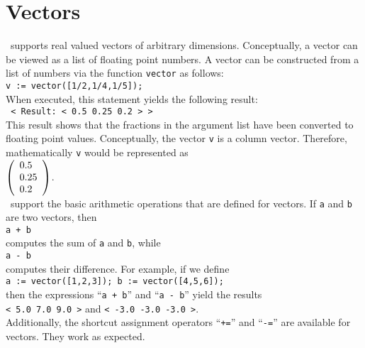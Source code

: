 \section{Vectors}
\setlx\ supports real valued vectors of arbitrary dimensions.  Conceptually, a vector can be viewed as
a list of floating point numbers.  A vector can be constructed from a list of numbers via the
function \texttt{vector} as follows:
\\[0.2cm]
\hspace*{1.3cm}
\texttt{v := vector([1/2,1/4,1/5]);}
\\[0.2cm]
When executed, this statement yields the following result:
\\[0.2cm]
\hspace*{1.3cm}
\texttt{~< Result: < 0.5  0.25  0.2 > >~}
\\[0.2cm]
This result shows that the fractions in the argument list have been converted to floating point
values.  Conceptually, the vector \texttt{v} is a column vector.  Therefore, mathematically
\texttt{v} would be represented as
\\[0.2cm]
\hspace*{1.3cm}
$
\left(\begin{array}[c]{l}
  0.5  \\
  0.25 \\
  0.2
\end{array}\right)
$.
\\[0.2cm]
\setlx\ support the basic arithmetic operations that are defined for vectors.  If \texttt{a} and
\texttt{b} are two vectors, then 
\\[0.2cm]
\hspace*{1.3cm}
\texttt{a + b}
\\[0.2cm]
computes the sum of \texttt{a} and \texttt{b}, while 
\\[0.2cm]
\hspace*{1.3cm}
\texttt{a - b}
\\[0.2cm]
computes their difference.  For example, if we define
\\[0.2cm]
\hspace*{1.3cm}
\texttt{a := vector([1,2,3]);   b := vector([4,5,6]);}
\\[0.2cm]
then the expressions ``\texttt{a + b}'' and ``\texttt{a - b}'' yield the results
\\[0.2cm]
\hspace*{1.3cm}
\texttt{< 5.0  7.0  9.0 >} \quad and \quad \texttt{< -3.0  -3.0  -3.0 >}.
\\[0.2cm]
Additionally, the shortcut assignment operators ``\texttt{+=}'' and ``\texttt{-=}'' are available
for vectors.  They work as expected.

